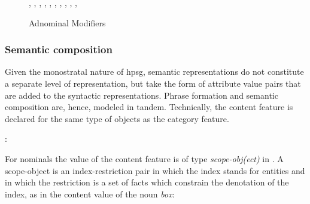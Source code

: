 \documentclass[output=paper]{langsci/langscibook}
\begin{document}
\begin{figure}
\begin{center}
\footnotesize
\tree
{,
  {,
    {}},
  {,
    {,
      {,
        {}},
      {,
        {}}},
    {,
      {}}}}
\caption{\label{lea} Adnominal Modifiers}
\normalsize
\end{center}
\end{figure}
 

\subsubsection{Semantic composition}


Given the monostratal nature of {\sc hpsg}, semantic representations 
do not constitute a separate level of representation, but take the form 
of attribute value pairs that are added to the syntactic representations.   
Phrase formation and semantic composition are, hence, modeled in tandem.  
Technically, the {\sc content} feature is declared for the same type of objects 
as the {\sc category} feature. 

\begin{exe} 
 : \begin{avm} 
                   \end{avm} 
\end{exe} 

\noindent 
For nominals the value of the {\sc content} feature is of type {\it scope-obj(ect)\/} 
in \citet{GS00}. 
A scope-object is an index-restriction pair in which the index stands for 
entities and in which the restriction is a set of facts which constrain the 
denotation of the index, as in the {\sc content} value of the noun {\it box\/}:    
\end{document}
